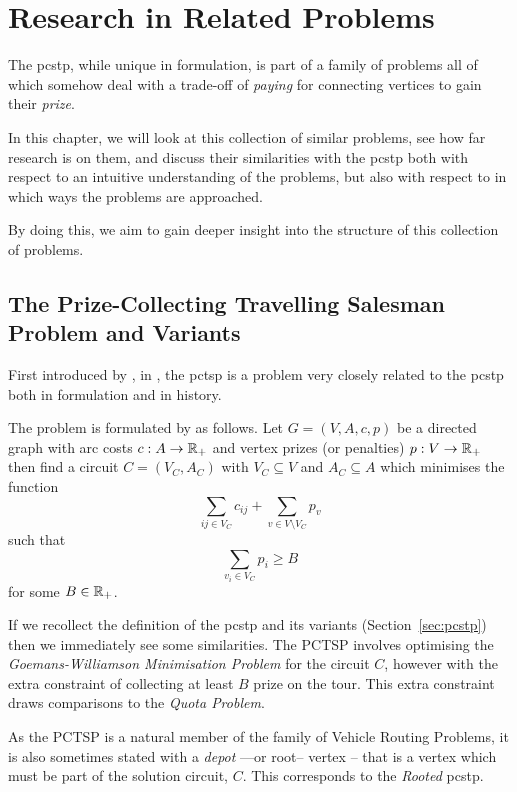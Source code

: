\chapter{Research in Related Problems}
\label{chap:related}
The \gls{pcstp}, while unique in formulation,
is part of a family of problems all of which somehow deal with a
trade-off of \textit{paying} for connecting vertices to gain their \textit{prize}.

In this chapter, we will look at this collection of similar problems,
see how far research is on them,
and discuss their similarities with the \gls{pcstp}
both with respect to an intuitive understanding of the problems,
but also with respect to in which ways the problems are approached.

By doing this, we aim to gain deeper insight into the structure of
this collection of problems.

\section{The Prize-Collecting Travelling Salesman Problem and Variants}\label{sec:rel:tsp}
First introduced by \citet*{balas1989prize}, in \citeyear{balas1989prize},
the \gls{pctsp} is a problem very closely related to the \gls{pcstp} both
in formulation and in history.

The problem is formulated by \citeauthor{balas1989prize} as follows. Let
$G = (V, A, c, p)$ be a directed
graph with arc costs $c: A \to \mathbb{R}_+$ and vertex prizes (or penalties) $p: V \to \mathbb{R}_+$
then find a circuit $C = (V_C, A_C)$ with $V_C \subseteq V$ and $A_C \subseteq A$ which
minimises the function
\[\sum_{ij \in V_C} c_{ij} + \sum_{v \in V \setminus V_C} p_v\]
such that
\[\sum_{v_i \in V_C} p_i \geq B\]
for some $B \in \mathbb{R}_+$.

If we recollect the definition of the \gls{pcstp}
and its variants (Section~\ref{sec:pcstp}) then
we immediately see some similarities. The PCTSP involves optimising the
\textit{Goemans-Williamson Minimisation Problem} for the circuit $C$,
however with the extra
constraint of collecting at least $B$ prize on the tour.
This extra constraint draws comparisons
to the \textit{Quota Problem}.

As the PCTSP is a natural member of the family of Vehicle Routing Problems, it is also sometimes
stated with a \textit{depot} ---or root--
vertex \citep{feillet2005traveling} -- that is a vertex which
must be part of the solution circuit, $C$. This corresponds to the \textit{Rooted}
\gls{pcstp}.


